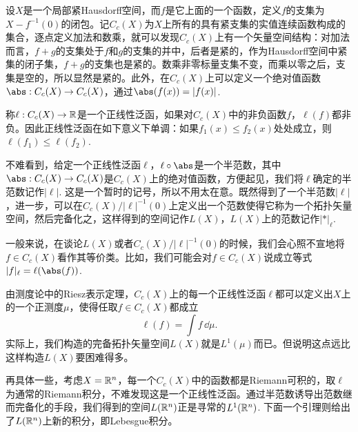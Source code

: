 
\begin{exa}
设$X$是一个局部紧Hausdorff空间，而$f$是它上面的一个函数，定义$f$的支集为$X-f^{-1}(0)$的闭包。记$C_c(X)$为$X$上所有的具有紧支集的实值连续函数构成的集合，逐点定义加法和数乘，就可以发现$C_c(X)$上有一个矢量空间结构：对加法而言，$f+g$的支集处于$f$和$g$的支集的并中，后者是紧的，作为Hausdorff空间中紧集的闭子集，$f+g$的支集也是紧的。数乘非零标量支集不变，而乘以零之后，支集是空的，所以显然是紧的。此外，在$C_c(X)$上可以定义一个绝对值函数$\abs:C_c(X)\to C_c(X)$，通过$\abs(f(x))=|f(x)|$. 

称$\ell:C_c(X)\to \mathbb{R}$是一个正线性泛函，如果对$C_c(X)$中的非负函数$f$，$\ell(f)$都非负。因此正线性泛函在如下意义下单调：如果$f_1(x)\leq f_2(x)$处处成立，则$\ell(f_1)\leq \ell(f_2)$.

不难看到，给定一个正线性泛函$\ell$，$\ell\circ \abs$是一个半范数，其中$\abs:C_c(X)\to C_c(X)$是$C_c(X)$上的绝对值函数，方便起见，我们将$\ell$确定的半范数记作$|\ell|$. 这是一个暂时的记号，所以不用太在意。既然得到了一个半范数$|\ell|$，进一步，可以在$C_c(X)/|\ell|^{-1}(0)$上定义出一个范数使得它称为一个拓扑矢量空间，然后完备化之，这样得到的空间记作$L(X)$，$L(X)$上的范数记作$|*|_\ell$. 

一般来说，在谈论$L(X)$或者$C_c(X)/|\ell|^{-1}(0)$的时候，我们会心照不宣地将$f\in C_c(X)$看作其等价类。比如，我们可能会对$f\in C_c(X)$说成立等式$|f|_\ell = \ell(\abs(f))$.

由测度论中的Riesz表示定理，$C_c(X)$上的每一个正线性泛函$\ell$都可以定义出$X$上的一个正测度$\mu$，使得任取$f\in C_c(X)$都成立
\[
	\ell(f)=\int f\,\dd \mu.
\]
实际上，我们构造的完备拓扑矢量空间$L(X)$就是$L^1(\mu)$而已。但说明这点远比这样构造$L(X)$要困难得多。

再具体一些，考虑$X=\mathbb{R}^n$，每一个$C_c(X)$中的函数都是Riemann可积的，取$\ell$为通常的Riemann积分，不难发现这是一个正线性泛函。通过半范数诱导出范数继而完备化的手段，我们得到的空间$L(\mathbb{R}^n)$正是寻常的$L^1(\mathbb{R}^n)$. 下面一个引理则给出了$L(\mathbb{R}^n)$上新的积分，即Lebesgue积分。
\end{exa}

